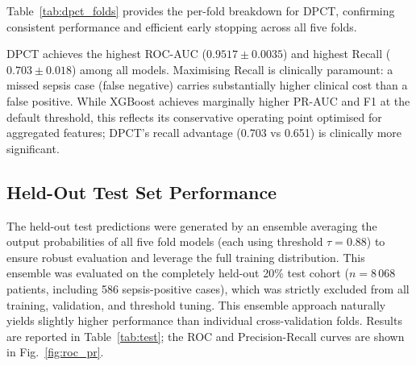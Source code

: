 \documentclass[conference,12pt]{IEEEtran}
\newcommand{\dpct}{\textsc{DPCT}}
\newcommand{\fig}[1]{Fig.~\ref{#1}}
\newcommand{\tab}[1]{Table~\ref{#1}}
\begin{document}
\tab{tab:dpct_folds} provides the per-fold breakdown for \dpct{}, confirming
consistent performance and efficient early stopping across all five folds.

\begin{table}[!t]
  \centering
  \caption{DPCT Per-Fold Cross-Validation Results (Best Fold~=~4)}
  \label{tab:dpct_folds}
  \small
  \renewcommand{\arraystretch}{1.1}
\end{table}

\dpct{} achieves the highest ROC-AUC ($0.9517 \pm 0.0035$) and highest Recall
($0.703 \pm 0.018$) among all models.
Maximising Recall is clinically paramount: a missed sepsis case (false negative)
carries substantially higher clinical cost than a false positive.
While XGBoost achieves marginally higher PR-AUC and F1 at the default threshold, this reflects its conservative operating point optimised for aggregated features; \dpct{}'s recall advantage (0.703 vs 0.651) is clinically more significant.

\subsection{\textbf{Held-Out Test Set Performance}}
\label{sec:results:test}

The held-out test predictions were generated by an ensemble averaging the output probabilities of all five fold models (each using threshold $\tau = 0.88$) to ensure robust evaluation and leverage the full training distribution.
This ensemble was evaluated on the completely held-out 20\% test
cohort ($n = 8\,068$ patients, including 586 sepsis-positive cases), which was
strictly excluded from all training, validation, and threshold tuning.
This ensemble approach naturally yields slightly higher performance than individual cross-validation folds.
Results are reported in \tab{tab:test}; the ROC and Precision-Recall curves are
shown in \fig{fig:roc_pr}.
\end{document}

